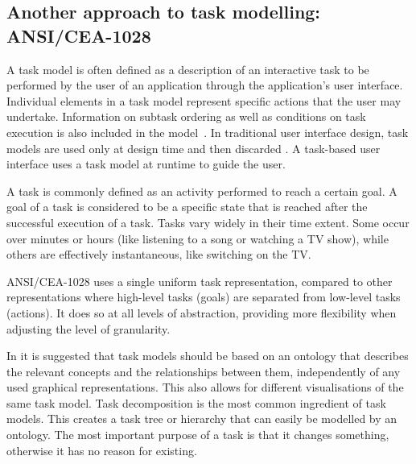 \subsection{Another approach to task modelling: ANSI/CEA-1028}
\label{cea2018}

	A task model is often defined as a description of an interactive task to be performed by the user of an application through the application's user interface. Individual elements in a task model represent specific actions that the user may undertake. Information on subtask ordering as well as conditions on task execution is also included in the model~\cite{Limbourg2004}. In traditional user interface design, task models are used only at design time and then discarded \cite{Rich2009}. A task-based user interface uses a task model at runtime to guide the user.

	A task is commonly defined as an activity performed to reach a certain goal. A goal of a task is considered to be a specific state that is reached after the successful execution of a task. Tasks vary widely in their time extent. Some occur over minutes or hours (like listening to a song or watching a TV show), while others are effectively instantaneous, like switching on the TV.

	ANSI/CEA-1028 \cite{Rich2009} uses a single uniform task representation, compared to other representations where high-level tasks (goals) are separated from low-level tasks (actions). It does so at all levels of abstraction, providing more flexibility when adjusting the level of granularity. %

	In \cite{VanWelie1998} it is suggested that task models should be based on an ontology that describes the relevant concepts and the relationships between them, independently of any used graphical representations. This also allows for different visualisations of the same task model. Task decomposition is the most common ingredient of task models. This creates a task tree or hierarchy that can easily be modelled by an ontology. The most important purpose of a task is that it changes something, otherwise it has no reason for existing.

	
